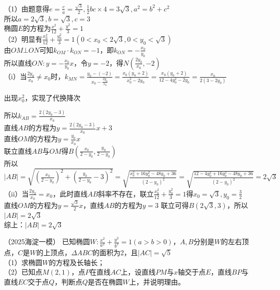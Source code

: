 \begin{solution}
（1）由题意得$e= \frac{c}{a}= \frac{\sqrt{3}}{2}, \frac{1}{2}bc\times 4 = 3\sqrt{3}, a^2 = b^2 + c^2$
\\
所以$a = 2\sqrt{3}, b= \sqrt{3}, c= 3$\\
椭圆$E$的方程为$\frac{x^2}{12}+\frac{y^2}{3}=1$\\
（2）明显有$\frac{x_0^2}{12} + \frac{y_0^2}{3}=1(0< x_0 < 2\sqrt{3}, 0 < y_0 < \sqrt{3})$\\
由$OM \bot ON $可知$k_{OM}\cdot k_{ON} = -1$，即$k_{ON} = -\frac{x_0}{y_0}$\\
所以直线$ON: y = -\frac{x_0}{y_0}x$，令$y = -2$，得$N (\frac{2y_0}{x_0}, -2)$ \\
（i）当$\frac{2y_0}{x_0} \ne x_0$时，$k_{MN} = \frac{y_0 - (-2)}{x_0 - \frac{2y_0}{x_0}} = \frac{x_0(y_0 + 2)}{x_0^2 -2y_0} = \frac{x_0(y_0 + 2)}{12-4y_0^2 -2y_0} = \frac{x_0}{2(3 - 2y_0)}$
\begin{note}
    出现$x_0^2$，实现了代换降次
\end{note}
\noindent 所以$k_{AB} = \frac{2(2y_0 - 3)}{x_0}$\\
直线$AB$的方程为$y =\frac{2(2y_0 - 3)}{x_0}x + 3 $\\
直线$OM$的方程为$y = \frac{y_0}{x_0}x$\\
联立直线$AB$与$OM$得$B(\frac{x_0}{2-y_0}, \frac{y_0}{2-y_0})$\\
所以$\vert AB \vert = \sqrt{(\frac{x_0}{2-y_0})^2+(\frac{y_0}{2-y_0} - 3)^2} = \sqrt{\frac{x_0^2 + 16y_0^2 -48y_0 +36}{(2-y_0)^2}} = \sqrt{\frac{12-4y_0^2 + 16y_0^2 -48y_0 + 36}{(2-y_0)^2}} = 2\sqrt{3}$\\
（ii）当$\frac{2y_0}{x_0} = x_0$，此时直线$AB$斜率不存在，联立$\frac{x_0^2}{12} + \frac{y_0^2}{3}=1$得$x_0 = \sqrt{3}, y_0 = \frac{3}{2}$\\
直线$OM$的方程为$y = \frac{\sqrt{3}}{2}x$，直线$AB$的方程为$y = 3$
联立可得$B(2\sqrt{3}, 3)$，所以$\vert AB \vert = 2\sqrt{3}$\\
综上：$\vert AB \vert = 2\sqrt{3}$
\end{solution}



\begin{example}
（2025海淀一模）
已知椭圆$W:\frac{x^2}{a^2}+\frac{y^2}{b^2}=1(a > b > 0)$，$A, B$分别是$W$的左右顶点，$C$是$W$的上顶点，$\Delta ABC$的面积为2，且$\vert AC \vert = \sqrt{5}$ \\
（1）求椭圆$W$的方程及长轴长；\\
（2）已知点$M(2,1)$，点$P$在直线$AC$上，设直线$PM$与$x$轴交于点$E$，直线$BP$与直线$EC$交于点$Q$，判断点$Q$是否在椭圆$W$上，并说明理由。

\end{example}


